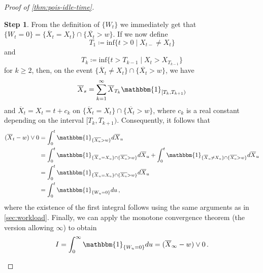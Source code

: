 \documentclass[titlepage]{article}
\theoremstyle{plain}
\theoremstyle{definition}
\newtheorem{proofpart}{Step}
\begin{document}
\begin{proof}[Proof of \cref{thm:pois-idle-time}]
  \begin{proofpart}
    From the definition of $\{ W_t \}$ we immediately get that $\{ W_t = 0 \} = \{ \overline{X}_t = X_t \} \cap {\{ \overline{X_t} > w \}}$. If we now define
    \begin{equation}
      T_1 \coloneqq \mathrm{inf} \{ t > 0 \mid X_{t-} \neq X_t \}
    \end{equation}
    and
    \begin{equation}
      T_k \coloneqq \mathrm{inf} \{ t > T_{k - 1} \mid X_t > X_{T_{k - 1}} \}
    \end{equation}
    for $k \geq 2$, then, on the event $\{ \overline{X}_t \neq X_t \} \cap {\{ \overline{X_t} > w \}}$, we have
    \begin{equation}
      \overline{X}_s = \sum_{k = 1}^\infty \overline{X}_{T_k} \mathbbm{1}_{[T_k, T_{k + 1})}
    \end{equation}
    and $\overline{X}_t = X_t = t + c_k$ on $\{ \overline{X}_t = X_t \} \cap {\{ \overline{X_t} > w \}}$, where $c_k$ is a real constant depending on the interval $[T_k, T_{k + 1})$. Consequently, it follows that
    \begin{align}
      (\overline{X}_t - w) \vee 0 & = \int_0^t \mathbbm{1}_{{\{ \overline{X_u} > w \}} } d\overline{X}_u                                                                                                                                           \\
                                  & = \int_0^t \mathbbm{1}_{ \{ \overline{X}_u = X_u \} \cap {\{ \overline{X_u} > w \}} } d\overline{X}_u + \int_0^t \mathbbm{1}_{ \{ \overline{X}_u \neq X_u \} \cap {\{ \overline{X_u} > w \}} } d\overline{X}_u \\
                                  & = \int_0^t \mathbbm{1}_{ \{ \overline{X}_u = X_u \} \cap {\{ \overline{X_u} > w \}} } d\overline{X}_u                                                                                                          \\
                                  & = \int_0^t \mathbbm{1}_{ \{W_u = 0 \} } du \,,
    \end{align}
    where the existence of the first integral follows using the same arguments as in \cref{sec:workload}. Finally, we can apply the monotone convergence theorem (the version allowing $\infty$) to obtain
    \begin{equation}
      I = \int_0^\infty \mathbbm{1}_{\{ W_u = 0 \}} du = (\overline{X}_\infty - w) \vee 0 \,.
    \end{equation}
  \end{proofpart}


\end{proof}
\end{document}
